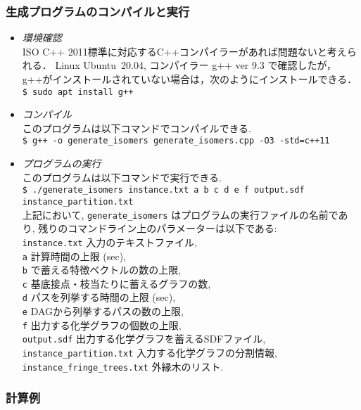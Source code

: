 \documentclass[11pt,titlepage,dvipdfmx,twoside]{jarticle}
\begin{document}
\subsubsection{生成プログラムのコンパイルと実行}
\label{sec:compile_m}
\begin{itemize}
  \item {\em 環境確認}\\
  ISO C++ 2011標準に対応するC++コンパイラーがあれば問題ないと考えられる．
  Linux Ubuntu~20.04, コンパイラー g++ ver 9.3 で確認したが，g++がインストールされていない場合は，次のようにインストールできる．\\
  \verb|$ sudo apt install g++|
  \item {\em コンパイル}\\
  このプログラムは以下コマンドでコンパイルできる.\\
  \verb|$ g++ -o generate_isomers generate_isomers.cpp -O3 -std=c++11| 
	\item {\em プログラムの実行}\\
  このプログラムは以下コマンドで実行できる.\\
		\verb|$ ./generate_isomers instance.txt a b c d e f output.sdf instance_partition.txt|\\
		上記において, {\tt generate\_isomers} はプログラムの実行ファイルの名前であり, 残りのコマンドライン上のパラメーターは以下である: \\
		\verb|instance.txt|  入力のテキストファイル, \\
		\verb|a| 計算時間の上限 (sec),  \\
		\verb|b| で蓄える特徴ベクトルの数の上限,  \\
		\verb|c| 基底接点・枝当たりに蓄えるグラフの数, \\
		\verb|d| パスを列挙する時間の上限 (sec),\\
		\verb|e| DAGから列挙するパスの数の上限,\\
		\verb|f| 出力する化学グラフの個数の上限, \\
		\verb|output.sdf| 出力する化学グラフを蓄えるSDFファイル, \\
		\verb|instance_partition.txt|  入力する化学グラフの分割情報,\\
		\verb|instance_fringe_trees.txt| 外縁木のリスト.\\
\end{itemize}


\subsubsection{計算例}
\label{sec:instance_p}
\end{document}
